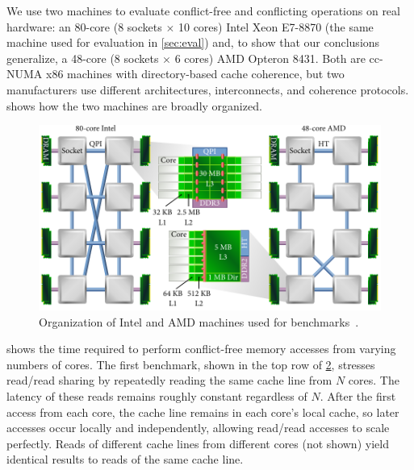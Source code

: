 We use two machines to evaluate conflict-free and conflicting
operations on real hardware: an 80-core (8 sockets $\times$ 10 cores)
Intel Xeon E7-8870 (the same machine used for evaluation in
\cref{sec:eval}) and, to show that our conclusions generalize, a
48-core (8 sockets $\times$ 6 cores) AMD Opteron 8431.
%
Both are cc-NUMA x86 machines with directory-based cache coherence,
but two manufacturers use different architectures, interconnects, and
coherence protocols.
%
 shows how the
two machines are broadly organized.

\begin{figure}
  \centering
  \includegraphics{figures/machines.pdf}
  \caption[Organization of benchmark machines.]{Organization of Intel
    and AMD machines used for
    benchmarks~\cite{ben-motherboard,tom-motherboard-1,tom-motherboard-2}.}
  \label{fig:machines}
\end{figure}


\begin{figure}
  \centering
  \label{fig:cfree-cycles}
\end{figure}

 shows the time required to perform
conflict-free memory accesses from varying numbers of cores.  The
first benchmark, shown in the top row of \cref{fig:cfree-cycles},
stresses read/read sharing by repeatedly reading the same cache line
from $N$ cores.  The latency of these reads remains roughly constant
regardless of $N$.
After the first access from each core, the cache
line remains in each core's local cache, so later accesses occur
locally and independently, allowing read/read accesses to scale
perfectly.  Reads of different cache lines from different cores (not
shown) yield identical results to reads of the same cache line.


